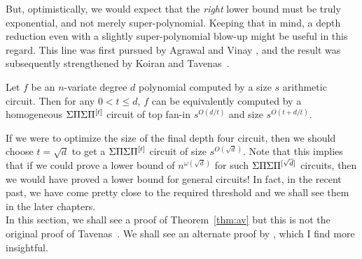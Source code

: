 But, optimistically, we would expect that the \emph{right} lower bound must be truly exponential, and not merely super-polynomial. Keeping that in mind, a depth reduction even with a slightly super-polynomial blow-up might be useful in this regard. This line was first pursued by Agrawal and Vinay \cite{av08}, and the result was subsequently strengthened by Koiran \cite{koiran} and Tavenas~\cite{Tav13}. 

\begin{theorem} \label{thm:av}
Let $f$ be an $n$-variate degree $d$ polynomial computed by a size $s$ arithmetic circuit. Then for any $0< t \leq d$, $f$ can be equivalently computed by a homogeneous $\Sigma\Pi\Sigma\Pi^{[t]}$ circuit of top fan-in $s^{O(d/t)}$ and size $s^{O(t + d/t)}$. 
\end{theorem}

If we were to optimize the size of the final depth four circuit, then we should choose $t = \sqrt{d}$ to get a $\Sigma\Pi\Sigma\Pi^{[t]}$ circuit of size $s^{O(\sqrt{d})}$. Note that this implies that if we could prove a lower bound of $n^{\omega(\sqrt{d})}$ for such $\Sigma\Pi\Sigma\Pi^{[\sqrt{d}]}$ circuits, then we would have proved a lower bound for general circuits! In fact, in the recent past, we have come pretty close to the required threshold and we shall see them in the later chapters. \\

In this section, we shall see a proof of Theorem~\ref{thm:av} but this is not the original proof of Tavenas~\cite{Tav13}. We shall see an alternate proof by \cite{saptharishivinay14}, which I find more insightful. 

